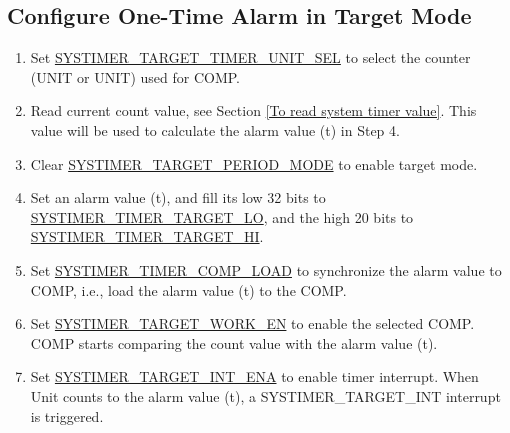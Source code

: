 \documentclass[main\_\_EN.tex]{subfiles}
\begin{document}
\subsection{Configure One-Time Alarm in Target Mode}
\begin{enumerate}
    \item Set \hyperref[fielddesc:SYSTIMERTARGET0TIMERUNITSEL]{SYSTIMER\_TARGET\_TIMER\_UNIT\_SEL} to select the counter (UNIT or UNIT) used for COMP.
    \item Read current count value, see Section \ref{To read system timer value}. This value will be used to calculate the alarm value (t) in Step 4.
    \item Clear \hyperref[fielddesc:SYSTIMERTARGET0PERIODMODE]{SYSTIMER\_TARGET\_PERIOD\_MODE} to enable target mode.
    \item Set an alarm value (t), and fill its low 32 bits to \hyperref[fielddesc:SYSTIMERTIMERTARGET0LO]{SYSTIMER\_TIMER\_TARGET\_LO}, and the high 20 bits to \hyperref[fielddesc:SYSTIMERTIMERTARGET0HI]{SYSTIMER\_TIMER\_TARGET\_HI}.
    \item Set \hyperref[fielddesc:SYSTIMERTIMERCOMP0LOAD]{SYSTIMER\_TIMER\_COMP\_LOAD} to synchronize the alarm value to COMP, i.e., load the alarm value (t) to the COMP.
    \item Set \hyperref[fielddesc:SYSTIMERTARGET0WORKEN]{SYSTIMER\_TARGET\_WORK\_EN} to enable the selected COMP. COMP starts comparing the count value with the alarm value (t).
    \item Set \hyperref[fielddesc:SYSTIMERTARGET0INTENA]{SYSTIMER\_TARGET\_INT\_ENA} to enable timer interrupt. When Unit counts to the alarm value (t), a SYSTIMER\_TARGET\_INT interrupt is triggered.
\end{enumerate}
\end{document}

